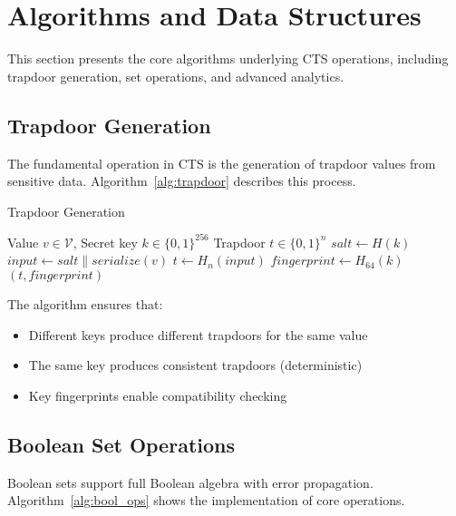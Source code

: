 \documentclass[../main_comprehensive.tex]{subfiles}
\begin{document}
\section{Algorithms and Data Structures}
\label{sec:algorithms}

This section presents the core algorithms underlying CTS operations, including trapdoor generation, set operations, and advanced analytics.

\subsection{Trapdoor Generation}

The fundamental operation in CTS is the generation of trapdoor values from sensitive data. Algorithm~\ref{alg:trapdoor} describes this process.

\begin{algorithm}
\caption{Trapdoor Generation}
\label{alg:trapdoor}
\begin{algorithmic}[1]
\REQUIRE Value $v \in \mathcal{V}$, Secret key $k \in \{0,1\}^{256}$
\ENSURE Trapdoor $t \in \{0,1\}^n$
\STATE $salt \leftarrow H(k)$ 
\STATE $input \leftarrow salt \| serialize(v)$ 
\STATE $t \leftarrow H_{n}(input)$ 
\STATE $fingerprint \leftarrow H_{64}(k)$ 
\RETURN $(t, fingerprint)$
\end{algorithmic}
\end{algorithm}

The algorithm ensures that:
\begin{itemize}
\item Different keys produce different trapdoors for the same value
\item The same key produces consistent trapdoors (deterministic)
\item Key fingerprints enable compatibility checking
\end{itemize}

\subsection{Boolean Set Operations}

Boolean sets support full Boolean algebra with error propagation. Algorithm~\ref{alg:bool_ops} shows the implementation of core operations.
\end{document}
